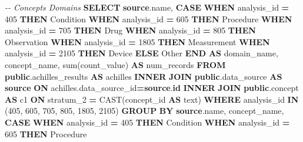 \documentclass[
]{book}
\newenvironment{Shaded}{\begin{snugshade}}{\end{snugshade}}
\newcommand{\CommentTok}[1]{\textcolor[rgb]{0.56,0.35,0.01}{\textit{#1}}}
\newcommand{\ControlFlowTok}[1]{\textcolor[rgb]{0.13,0.29,0.53}{\textbf{#1}}}
\newcommand{\DecValTok}[1]{\textcolor[rgb]{0.00,0.00,0.81}{#1}}
\newcommand{\FunctionTok}[1]{\textcolor[rgb]{0.00,0.00,0.00}{#1}}
\newcommand{\KeywordTok}[1]{\textcolor[rgb]{0.13,0.29,0.53}{\textbf{#1}}}
\newcommand{\NormalTok}[1]{#1}
\newcommand{\OperatorTok}[1]{\textcolor[rgb]{0.81,0.36,0.00}{\textbf{#1}}}
\newcommand{\StringTok}[1]{\textcolor[rgb]{0.31,0.60,0.02}{#1}}
\begin{document}
\begin{Shaded}
\begin{Highlighting}[]
\CommentTok{{-}{-} Concepts Domains}
\KeywordTok{SELECT} \KeywordTok{source}\NormalTok{.name,}
    \ControlFlowTok{CASE} \ControlFlowTok{WHEN}\NormalTok{ analysis\_id }\OperatorTok{=} \DecValTok{405} \ControlFlowTok{THEN} \StringTok{\textquotesingle{}Condition\textquotesingle{}}
    \ControlFlowTok{WHEN}\NormalTok{ analysis\_id }\OperatorTok{=} \DecValTok{605} \ControlFlowTok{THEN} \StringTok{\textquotesingle{}Procedure\textquotesingle{}}
    \ControlFlowTok{WHEN}\NormalTok{ analysis\_id }\OperatorTok{=} \DecValTok{705} \ControlFlowTok{THEN} \StringTok{\textquotesingle{}Drug\textquotesingle{}}
    \ControlFlowTok{WHEN}\NormalTok{ analysis\_id }\OperatorTok{=} \DecValTok{805} \ControlFlowTok{THEN} \StringTok{\textquotesingle{}Observation\textquotesingle{}}
    \ControlFlowTok{WHEN}\NormalTok{ analysis\_id }\OperatorTok{=} \DecValTok{1805} \ControlFlowTok{THEN} \StringTok{\textquotesingle{}Measurement\textquotesingle{}}
    \ControlFlowTok{WHEN}\NormalTok{ analysis\_id }\OperatorTok{=} \DecValTok{2105} \ControlFlowTok{THEN} \StringTok{\textquotesingle{}Device\textquotesingle{}}
    \ControlFlowTok{ELSE} \StringTok{\textquotesingle{}Other\textquotesingle{}} \ControlFlowTok{END} \KeywordTok{AS}\NormalTok{ domain\_name,}
\NormalTok{    concept\_name, }\FunctionTok{sum}\NormalTok{(count\_value) }\KeywordTok{AS}\NormalTok{ num\_records}
\KeywordTok{FROM} \KeywordTok{public}\NormalTok{.achilles\_results }\KeywordTok{AS}\NormalTok{ achilles }
    \KeywordTok{INNER} \KeywordTok{JOIN} \KeywordTok{public}\NormalTok{.data\_source }\KeywordTok{AS} \KeywordTok{source} \KeywordTok{ON} 
\NormalTok{      achilles.data\_source\_id}\OperatorTok{=}\KeywordTok{source}\NormalTok{.}\KeywordTok{id}
    \KeywordTok{INNER} \KeywordTok{JOIN} \KeywordTok{public}\NormalTok{.concept }\KeywordTok{AS}\NormalTok{ c1 }\KeywordTok{ON} 
\NormalTok{      stratum\_2 }\OperatorTok{=} \FunctionTok{CAST}\NormalTok{(concept\_id }\KeywordTok{AS}\NormalTok{ text)}
\KeywordTok{WHERE}\NormalTok{ analysis\_id }\KeywordTok{IN}\NormalTok{ (}\DecValTok{405}\NormalTok{, }\DecValTok{605}\NormalTok{, }\DecValTok{705}\NormalTok{, }\DecValTok{805}\NormalTok{, }\DecValTok{1805}\NormalTok{, }\DecValTok{2105}\NormalTok{)}
\KeywordTok{GROUP} \KeywordTok{BY} \KeywordTok{source}\NormalTok{.name, concept\_name, }
    \ControlFlowTok{CASE} \ControlFlowTok{WHEN}\NormalTok{ analysis\_id }\OperatorTok{=} \DecValTok{405} \ControlFlowTok{THEN} \StringTok{\textquotesingle{}Condition\textquotesingle{}}
    \ControlFlowTok{WHEN}\NormalTok{ analysis\_id }\OperatorTok{=} \DecValTok{605} \ControlFlowTok{THEN} \StringTok{\textquotesingle{}Procedure\textquotesingle{}}

\end{Highlighting}
\end{Shaded}
\end{document}
